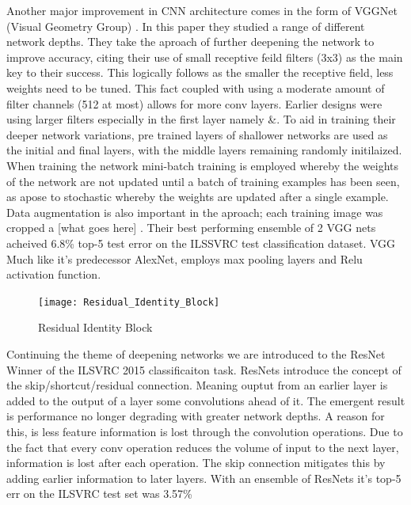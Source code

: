  Another major improvement in CNN architecture comes in the form of VGGNet (Visual Geometry Group) \cite{Simonyan2015}. In this paper they studied a range of different network depths. They take the aproach of further deepening the network to improve accuracy, citing their use of small receptive feild filters (3x3) as the main key to their success. This logically follows as the smaller the receptive field, less weights need to be tuned. This fact coupled with using a moderate amount of filter channels (512 at most) allows for more conv layers. Earlier designs were using larger filters especially in the first layer namely \cite{Krizhevsky}\&\cite{Sermanet2013}. To aid in training their deeper network variations, pre trained layers of shallower networks are used as the initial and final layers, with the middle layers remaining randomly initilaized. When training the network mini-batch training is employed whereby the weights of the network are not updated until a batch of training examples has been seen, as apose to stochastic whereby the weights are updated after a single example. Data augmentation is also important in the aproach; each training image was cropped a [what goes here] . Their best performing ensemble of 2 VGG nets acheived 6.8\% top-5 test error on the ILSSVRC test classification dataset. VGG Much like it's predecessor AlexNet, employs max pooling layers and Relu activation function.
  \par
  \begin{figure}
    \centering
    \texttt{[image: Residual\_Identity\_Block]}
    \caption{\label{fig:resnet_id_block}Residual Identity Block}
  \end{figure}
  Continuing the theme of deepening networks we are introduced to the ResNet \cite{He} Winner of the ILSVRC 2015 classificaiton task. ResNets introduce the concept of the skip/shortcut/residual connection. Meaning ouptut from an earlier layer is added to the output of a layer some convolutions ahead of it. The emergent result is performance no longer degrading with greater network depths. A reason for this, is less feature information is lost through the convolution operations. Due to the fact that every conv operation reduces the volume of input to the next layer, information is lost after each operation. The skip connection mitigates this by adding earlier information to later layers. With an ensemble of ResNets it's top-5 err on the ILSVRC test set was 3.57\%
  \par
